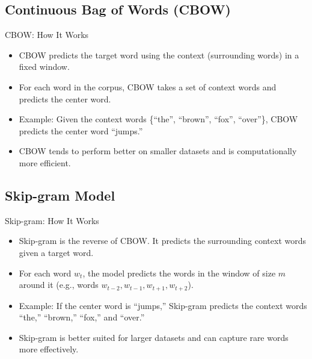 \documentclass[serif, aspectratio=169]{beamer}
\begin{document}
\subsection{Continuous Bag of Words (CBOW)}

\begin{frame}{CBOW: How It Works}
    \begin{itemize}
        \item CBOW predicts the target word using the context (surrounding words) in a fixed window.
        \item For each word in the corpus, CBOW takes a set of context words and predicts the center word.
        \item Example: Given the context words \{“the”, “brown”, “fox”, “over”\}, CBOW predicts the center word “jumps.”
        \item CBOW tends to perform better on smaller datasets and is computationally more efficient.
    \end{itemize}
\end{frame}

\subsection{Skip-gram Model}

\begin{frame}{Skip-gram: How It Works}
    \begin{itemize}
        \item Skip-gram is the reverse of CBOW. It predicts the surrounding context words given a target word.
        \item For each word \(w_t\), the model predicts the words in the window of size \(m\) around it (e.g., words \(w_{t-2}, w_{t-1}, w_{t+1}, w_{t+2}\)).
        \item Example: If the center word is “jumps,” Skip-gram predicts the context words “the,” “brown,” “fox,” and “over.”
        \item Skip-gram is better suited for larger datasets and can capture rare words more effectively.
    \end{itemize}
\end{frame}
\end{document}
